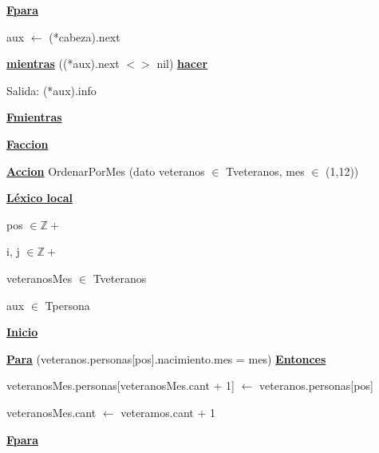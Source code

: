 \documentclass{article}
\begin{document}
            \hspace{12mm}\underline{\textbf{Fpara}}

            \hspace{12mm}aux $\leftarrow$ (*cabeza).next

            \hspace{12mm}\underline{\textbf{mientras}} ((*aux).next $<>$ nil) \underline{\textbf{hacer}}

                \hspace{16mm}Salida: (*aux).info

            \hspace{12mm}\underline{\textbf{Fmientras}}

    \hspace{4mm}\underline{\textbf{Faccion}}

    \vspace{4mm}

    \hspace{4mm}\underline{\textbf{Accion}} OrdenarPorMes (dato veteranos $\in$ Tveteranos, mes $\in$ (1,12))

        \hspace{8mm}\underline{\textbf{Léxico local}}

            \hspace{12mm}pos $\in \mathbb{Z}+$

            \hspace{12mm}i, j $\in \mathbb{Z}+$

            \hspace{12mm}veteranosMes $\in$ Tveteranos

            \hspace{12mm}aux $\in$ Tpersona

        \hspace{8mm}\underline{\textbf{Inicio}}

            \hspace{12mm}\underline{\textbf{Para}} (veteranos.personas[pos].nacimiento.mes = mes) \underline{\textbf{Entonces}}

                \hspace{16mm}veteranosMes.personas[veteranosMes.cant + 1] $\leftarrow$ veteranos.personas[pos]

                \hspace{16mm}veteranosMes.cant $\leftarrow$ veteramos.cant + 1

            \hspace{12mm}\underline{\textbf{Fpara}}
\end{document}
